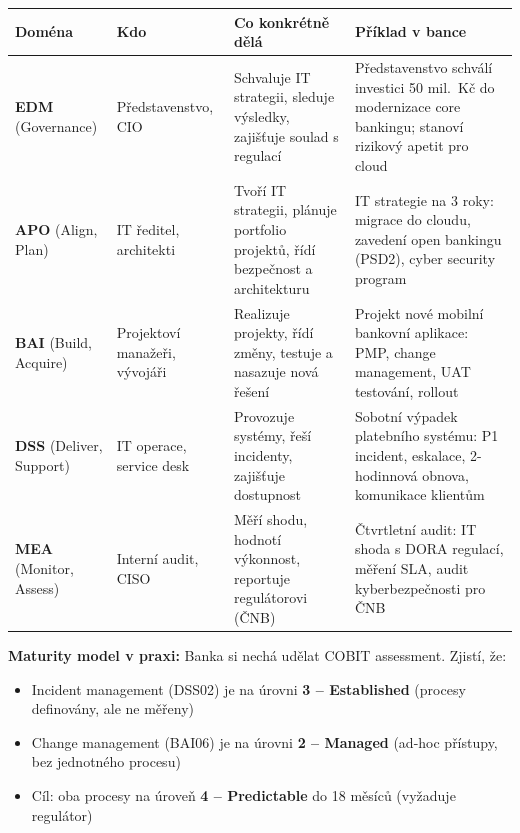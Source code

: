 \begin{center}
\begin{tabular}{p{1.8cm}p{2.6cm}p{3.5cm}p{5cm}}
\toprule
\textbf{Doména} & \textbf{Kdo} & \textbf{Co konkrétně dělá} & \textbf{Příklad v bance} \\
\midrule
\textbf{EDM} \newline (Governance) &
  Představenstvo, CIO &
  Schvaluje IT strategii, sleduje výsledky, zajišťuje soulad s regulací &
  Představenstvo schválí investici 50 mil.\ Kč do modernizace core bankingu; stanoví rizikový apetit pro cloud \\
\midrule
\textbf{APO} \newline (Align, Plan) &
  IT ředitel, architekti &
  Tvoří IT strategii, plánuje portfolio projektů, řídí bezpečnost a architekturu &
  IT strategie na 3 roky: migrace do cloudu, zavedení open bankingu (PSD2), cyber security program \\
\midrule
\textbf{BAI} \newline (Build, Acquire) &
  Projektoví manažeři, vývojáři &
  Realizuje projekty, řídí změny, testuje a nasazuje nová řešení &
  Projekt nové mobilní bankovní aplikace: PMP, change management, UAT testování, rollout \\
\midrule
\textbf{DSS} \newline (Deliver, Support) &
  IT operace, service desk &
  Provozuje systémy, řeší incidenty, zajišťuje dostupnost &
  Sobotní výpadek platebního systému: P1 incident, eskalace, 2-hodinnová obnova, komunikace klientům \\
\midrule
\textbf{MEA} \newline (Monitor, Assess) &
  Interní audit, CISO &
  Měří shodu, hodnotí výkonnost, reportuje regulátorovi (ČNB) &
  Čtvrtletní audit: IT shoda s DORA regulací, měření SLA, audit kyberbezpečnosti pro ČNB \\
\bottomrule
\end{tabular}
\end{center}

\textbf{Maturity model v praxi:} Banka si nechá udělat COBIT assessment. Zjistí, že:
\begin{itemize}
  \item Incident management (DSS02) je na úrovni \textbf{3 -- Established} (procesy definovány, ale ne měřeny)
  \item Change management (BAI06) je na úrovni \textbf{2 -- Managed} (ad-hoc přístupy, bez jednotného procesu)
  \item Cíl: oba procesy na úroveň \textbf{4 -- Predictable} do 18 měsíců (vyžaduje regulátor)
\end{itemize}

